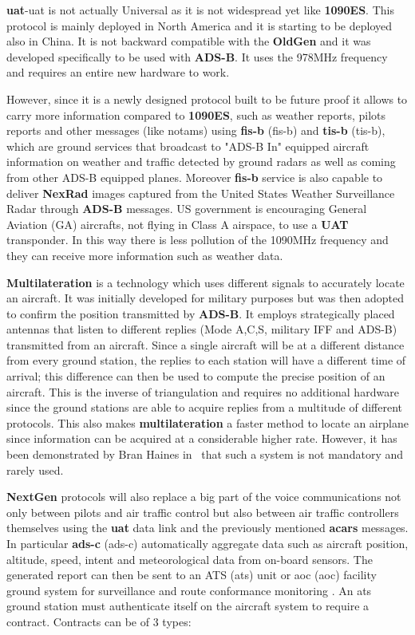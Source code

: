 \documentclass[../main.tex]{subfiles}
\begin{document}
\textbf{\acrshort{uat}}-\acrlong{uat} is not actually Universal as it is not widespread yet like \textbf{1090ES}. This protocol is mainly deployed in North America and it is starting to be deployed also in China. It is not backward compatible with the \textbf{OldGen} and it was developed specifically to be used with \textbf{ADS-B}. It uses the 978MHz frequency and requires an entire new hardware to work.

However, since it is a newly designed protocol built to be future proof it allows to carry more information compared to \textbf{1090ES}, such as weather reports, pilots reports and other messages (like \acrshort{notam}s) using  \textbf{\acrshort{fis-b}} (\acrlong{fis-b}) and \textbf{\acrshort{tis-b}} (\acrlong{tis-b}), which are ground services that broadcast to "ADS-B In" equipped aircraft information on weather and traffic detected by ground radars as well as coming from other ADS-B equipped planes. Moreover \textbf{\acrshort{fis-b}} service is also capable to deliver \textbf{NexRad} images captured from the United States Weather Surveillance Radar through \textbf{ADS-B} messages. US government is encouraging General Aviation (GA) aircrafts, not flying in Class A airspace, to use a \textbf{UAT} transponder. In this way there is less pollution of the 1090MHz frequency and they can receive more information such as weather data.

\textbf{Multilateration} is a technology which uses different signals to accurately locate an aircraft. It was initially developed for military purposes but was then adopted to confirm the position transmitted by \textbf{ADS-B}. It employs strategically placed antennas that listen to different replies (Mode A,C,S, military IFF and ADS-B) transmitted from an aircraft. Since a single aircraft will be at a different distance from every ground station, the replies to each station will have a different time of arrival; this difference can then be used to compute the precise position of an aircraft. This is the inverse of triangulation and requires no additional hardware since the ground stations are able to acquire replies from a multitude of different protocols. This also makes \textbf{multilateration} a faster method to locate an airplane since information can be acquired at a considerable higher rate. However, it has been demonstrated by Bran Haines in~\cite{haineshackfest} that such a system is not mandatory and rarely used.

\textbf{NextGen} protocols will also replace a big part of the voice communications not only between pilots and air traffic control but also between air traffic controllers themselves using the \textbf{\acrshort{uat}} data link and the previously mentioned \textbf{\acrshort{acars}} messages.
In particular \textbf{\acrshort{ads-c}} (\acrlong{ads-c}) automatically aggregate data such as aircraft position, altitude, speed, intent and meteorological data from on-board sensors. The generated report can then be sent to an ATS (\acrlong{ats}) unit or \acrshort{aoc} (\acrlong{aoc}) facility ground system for surveillance and route conformance monitoring \cite{goldman}. An \acrshort{ats} ground station must authenticate itself on the aircraft system to require a contract. Contracts can be of 3 types:
\end{document}
